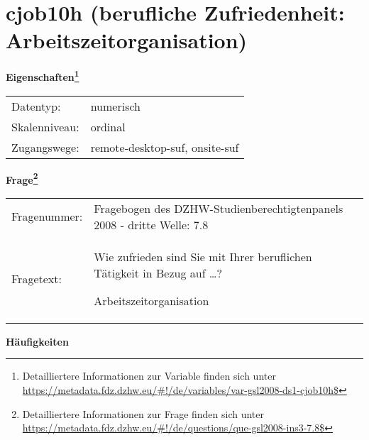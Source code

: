 
    \setcounter{footnote}{0}

    \vspace*{-1.8cm}
	\section{cjob10h (berufliche Zufriedenheit: Arbeitszeitorganisation)}
	\label{section:cjob10h}



    \vspace*{0.5cm}
    \noindent\textbf{Eigenschaften\footnote{Detailliertere Informationen zur Variable finden sich unter
		\url{https://metadata.fdz.dzhw.eu/\#!/de/variables/var-gsl2008-ds1-cjob10h$}}}\\
	\begin{tabularx}{\hsize}{@{}lX}
	Datentyp: & numerisch \\
	Skalenniveau: & ordinal \\
	Zugangswege: &
	  remote-desktop-suf, 
	  onsite-suf
 \\
    \end{tabularx}



				\vspace*{0.5cm}
                \noindent\textbf{Frage\footnote{Detailliertere Informationen zur Frage finden sich unter
		              \url{https://metadata.fdz.dzhw.eu/\#!/de/questions/que-gsl2008-ins3-7.8$}}}\\
				\begin{tabularx}{\hsize}{@{}lX}
					Fragenummer: &
					  Fragebogen des DZHW-Studienberechtigtenpanels 2008 - dritte Welle:
					  7.8
 \\
					Fragetext: & Wie zufrieden sind Sie mit Ihrer beruflichen Tätigkeit in Bezug auf …?\par  Arbeitszeitorganisation \\
				\end{tabularx}





        		\vspace*{0.5cm}
                \noindent\textbf{Häufigkeiten}

